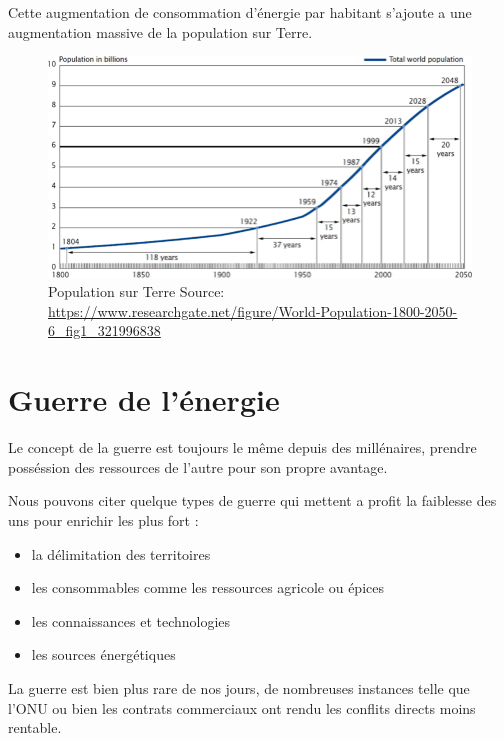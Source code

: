 Cette augmentation de consommation d'énergie par habitant 
s'ajoute a une augmentation massive de la population sur Terre.

\begin{figure}
  \centering
  \includegraphics[scale=0.35]{media/WorldPopulation.png}
  \caption{
      Population sur Terre\newline
      \tiny{Source:\newline
        \url{https://www.researchgate.net/figure/World-Population-1800-2050-6_fig1_321996838}
      }
  }
  \label{fig:capita_energy}
\end{figure}

\section{Guerre de l'énergie}

Le concept de la guerre est toujours le même depuis des millénaires, prendre posséssion des
ressources de l'autre pour son propre avantage.

Nous pouvons citer quelque types de guerre qui mettent a profit la faiblesse des uns
pour enrichir les plus fort :

\begin{itemize}
  \item la délimitation des territoires %
  \item les consommables comme les ressources agricole ou épices
  \item les connaissances et technologies
  \item les sources énergétiques
\end{itemize}

La guerre est bien plus rare de nos jours, de nombreuses instances telle que l'ONU ou bien les
contrats commerciaux ont rendu les conflits directs moins rentable.

